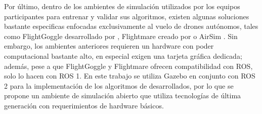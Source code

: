Por último, dentro de los ambientes de simulación utilizados por los equipos participantes para entrenar y validar sus algoritmos, existen algunas soluciones bastante especificas enfocadas exclusivamente al vuelo de drones autónomos, tales como FlightGoggle desarrollado por \citet{guerra2019flightgoggles}, Flightmare creado por \citet{song2020flightmare} o AirSim \cite{airsim2017fsr}. Sin embargo, los ambientes anteriores requieren un hardware con poder computacional bastante alto, en especial exigen una tarjeta gráfica dedicada; además, pese a que FlightGoggle y Flightmare ofrecen compatibilidad con ROS, solo lo hacen con ROS 1. En este trabajo se utiliza Gazebo en conjunto con ROS 2 para la implementación de los algoritmos de desarrollados, por lo que se propone un ambiente de simulación abierto que utiliza tecnologías de última generación con requerimientos de hardware básicos.
